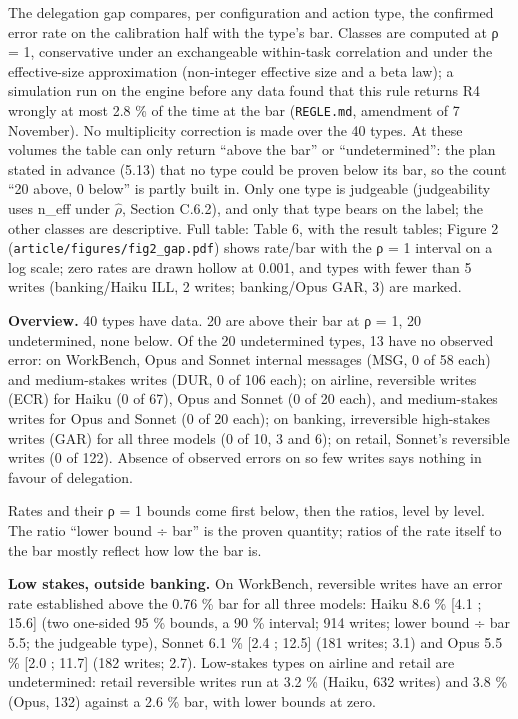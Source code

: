 The delegation gap compares, per configuration and action type, the confirmed error rate on the calibration half with the type's bar. Classes are computed at ρ = 1, conservative under an exchangeable within-task correlation and under the effective-size approximation (non-integer effective size and a beta law); a simulation run on the engine before any data found that this rule returns R4 wrongly at most 2.8 \% of the time at the bar (\texttt{REGLE.\allowbreak{}md}, amendment of 7 November). No multiplicity correction is made over the 40 types. At these volumes the table can only return ``above the bar'' or ``undetermined'': the plan stated in advance (5.13) that no type could be proven below its bar, so the count ``20 above, 0 below'' is partly built in. Only one type is judgeable (judgeability uses n\_eff under \ensuremath{\hat{\rho}}, Section C.6.2), and only that type bears on the label; the other classes are descriptive. Full table: Table 6, with the result tables; Figure 2 (\texttt{article/\allowbreak{}figures/\allowbreak{}fig2\_\allowbreak{}gap.\allowbreak{}pdf}) shows rate/bar with the ρ = 1 interval on a log scale; zero rates are drawn hollow at 0.001, and types with fewer than 5 writes (banking/Haiku ILL, 2 writes; banking/Opus GAR, 3) are marked.

\textbf{Overview.} 40 types have data. 20 are above their bar at ρ = 1, 20 undetermined, none below. Of the 20 undetermined types, 13 have no observed error: on WorkBench, Opus and Sonnet internal messages (MSG, 0 of 58 each) and medium-stakes writes (DUR, 0 of 106 each); on airline, reversible writes (ECR) for Haiku (0 of 67), Opus and Sonnet (0 of 20 each), and medium-stakes writes for Opus and Sonnet (0 of 20 each); on banking, irreversible high-stakes writes (GAR) for all three models (0 of 10, 3 and 6); on retail, Sonnet's reversible writes (0 of 122). Absence of observed errors on so few writes says nothing in favour of delegation.

Rates and their ρ = 1 bounds come first below, then the ratios, level by level. The ratio ``lower bound ÷ bar'' is the proven quantity; ratios of the rate itself to the bar mostly reflect how low the bar is.

\textbf{Low stakes, outside banking.} On WorkBench, reversible writes have an error rate established above the 0.76 \% bar for all three models: Haiku 8.6 \% {[}4.1 ; 15.6{]} (two one-sided 95 \% bounds, a 90 \% interval; 914 writes; lower bound ÷ bar 5.5; the judgeable type), Sonnet 6.1 \% {[}2.4 ; 12.5{]} (181 writes; 3.1) and Opus 5.5 \% {[}2.0 ; 11.7{]} (182 writes; 2.7). Low-stakes types on airline and retail are undetermined: retail reversible writes run at 3.2 \% (Haiku, 632 writes) and 3.8 \% (Opus, 132) against a 2.6 \% bar, with lower bounds at zero.

